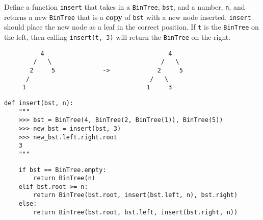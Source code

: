 \question
Define a function \texttt{insert} that takes in a \texttt{BinTree},
\texttt{bst}, and a number, \texttt{n}, and returns a new \texttt{BinTree} that is a \textbf{copy} of \texttt{bst} with a new node inserted. \texttt{insert} should place the new node
as a leaf in the correct position. If \texttt{t} is the \texttt{BinTree} on
the left, then calling \texttt{insert(t, 3)} will return the \texttt{BinTree} on the
right.

\begin{center}
\begin{lstlisting}
          4                                  4
        /   \                              /   \
       2     5             ->             2     5
      /                                 /   \
     1                                 1     3

\end{lstlisting}
\end{center}

\begin{lstlisting}
def insert(bst, n):
    """
    >>> bst = BinTree(4, BinTree(2, BinTree(1)), BinTree(5))
    >>> new_bst = insert(bst, 3)
    >>> new_bst.left.right.root
    3
    """
\end{lstlisting}
\begin{solution}[1in]
\begin{lstlisting}
    if bst == BinTree.empty:
        return BinTree(n)
    elif bst.root >= n:
        return BinTree(bst.root, insert(bst.left, n), bst.right)
    else:
        return BinTree(bst.root, bst.left, insert(bst.right, n))
\end{lstlisting}
\end{solution}
